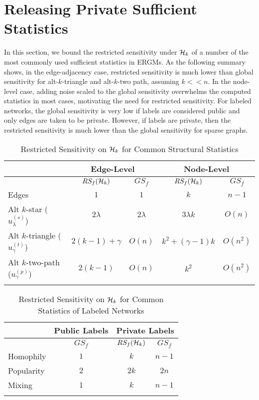 \section{Releasing Private Sufficient Statistics}
\label{sec:release_suff_stats}

In this section, we bound the restricted sensitivity under $\mathcal{H}_{k}$ of a number of the most commonly used sufficient statistics in ERGMs. As the following summary shows, in the edge-adjacency case, restricted sensitivity is much lower than global sensitivity for alt-$k$-triangle and alt-$k$-two path, assuming $k << n$. In the node-level case, adding noise scaled to the global sensitivity overwhelms the computed statistics in most cases, motivating the need for restricted sensitivity. For labeled networks, the global sensitivity is very low if labels are considered public and only edges are taken to be private. However, if labels are private, then the restricted sensitivity is much lower than the global sensitivity for sparse graphs. 

\begin{table}[!ht]
	\caption{Restricted Sensitivity on $\mathcal{H}_k$ for Common Structural Statistics}
	\begin{center}
	\begin{tabular}{|l|c|c|c|c|}
		\hhline{|=====|}
		 & \multicolumn{2}{c|}{Edge-Level} & \multicolumn{2}{c|}{Node-Level} \\\hline
		& $RS_f(\mathcal{H}_k)$ & $GS_f$ & $RS_f(\mathcal{H}_k)$ & $GS_f$ \\ \hline
		Edges & $1$ & $1$ & $k$  & $n-1$\\ \hline
		Alt $k$-star ($u_\lambda^{(s)}$) & $2\lambda$ & $2\lambda$  & $3 \lambda k$  & $O(n)$\\ \hline
		Alt $k$-triangle  ($u_\gamma^{(t)}$)  & $2(k-1) + \gamma$ & $O(n)$  & $k^2 + (\gamma -1)k$ & $O(n^2)$\\ \hline
		Alt $k$-two-path  ($u_\gamma^{(p)}$)  & $2(k-1)$ & $O(n)$    & $k^2$ & $O(n^2)$\\	
		\hhline{|=====|}
	\end{tabular}
	\end{center}
\end{table}

\begin{table}[!ht]
		\caption{Restricted Sensitivity on $\mathcal{H}_k$ for Common Statistics of  Labeled Networks}
		\begin{center}
		\begin{tabular}{|l|c|c|c|}
		\hhline{|====|}
		& \multicolumn{1}{c|}{Public Labels} & \multicolumn{2}{c|}{Private Labels} \\\hline
		 & $GS_f$ & $RS_f(\mathcal{H}_k)$ & $GS_f$ \\ \hline
		Homophily &  $1$ & $k$  & $n-1$\\ \hline
		Popularity  & $2$  & $2k$ & $2n$\\ \hline
		Mixing & $1$    & $k$ & $n-1$\\	 \hhline{|====|}
	\end{tabular}
	\end{center}
\end{table}

